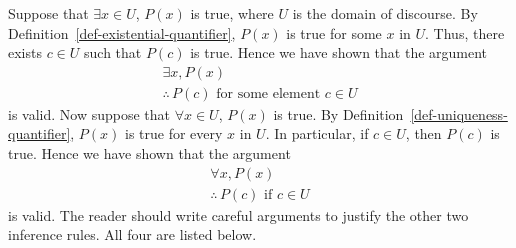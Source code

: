 \documentclass[
  letterpaper,
  10pt,
  reqno,
  twopage,
  openany]{book}
\theoremstyle{plain}
\theoremstyle{definition}
\theoremstyle{definition}
\theoremstyle{definition}
\theoremstyle{plain}
\theoremstyle{plain}
\theoremstyle{remark}
\begin{document}
Suppose that \(\exists x\in U\), \(P(x)\) is true, where \(U\) is the
domain of discourse. By Definition~\ref{def-existential-quantifier},
\(P(x)\) is true for some \(x\) in \(U\). Thus, there exists \(c\in U\)
such that \(P(c)\) is true. Hence we have shown that the argument \[
\begin{array}{l} 
\exists x, P(x)
\\ \hline
\therefore \, \text{$P(c)$ for some element $c\in U$} 
\end{array} 
\] is valid. Now suppose that \(\forall x\in U\), \(P(x)\) is true. By
Definition~\ref{def-uniqueness-quantifier}, \(P(x)\) is true for every
\(x\) in \(U\). In particular, if \(c\in U\), then \(P(c)\) is true.
Hence we have shown that the argument \[
\begin{array}{l} 
\forall x, P(x)
\\ \hline
\therefore \, \text{$P(c)$ if $c\in U$}
\end{array}
\] is valid. The reader should write careful arguments to justify the
other two inference rules. All four are listed below.
\end{document}
